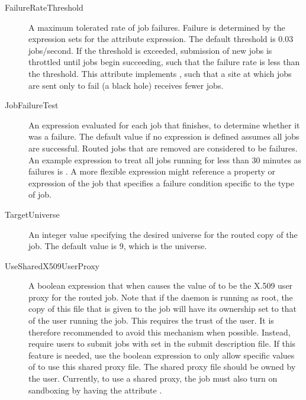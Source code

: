 \begin{description}
\item[FailureRateThreshold] A maximum tolerated rate of job failures.
Failure is determined by the expression sets for 
the attribute  expression.
The default threshold is 0.03 jobs/second.
If the threshold is exceeded,
submission of new jobs is throttled until jobs begin succeeding,
such that the failure rate is less than the threshold.
This attribute implements ,
such that a site at which jobs are sent only to fail (a black hole)
receives fewer jobs.

\item[JobFailureTest] An expression
evaluated for each job that finishes,
to determine whether it was a failure.
The default value if no expression is defined
assumes all jobs are successful.
Routed jobs that are removed are considered to be failures.
An example expression to treat all jobs running for less than 30 minutes as
failures is .  A more flexible
expression might reference a property or expression of the job that
specifies a failure condition specific to the type of job.

\item[TargetUniverse] An integer value specifying the desired
universe for the routed copy of the job.  The default value is 9, 
which is the  universe.

\item[UseSharedX509UserProxy] A boolean expression
that when  causes the value of 
to be the X.509 user proxy for the routed job.
Note that if the  daemon is running as root,
the copy of this file that is given to the job
will have its ownership set to that of the user running the job.
This requires the trust of the user.
It is therefore recommended to avoid this mechanism when possible.
Instead,
require users to submit jobs with 
set in the submit description  file.
If this feature is needed,
use the boolean expression to only allow specific values of 
to use this shared proxy file.
The shared proxy file should be owned by the  user.
Currently, to use a shared proxy, the job must also
turn on sandboxing by having the attribute .


\end{description}
